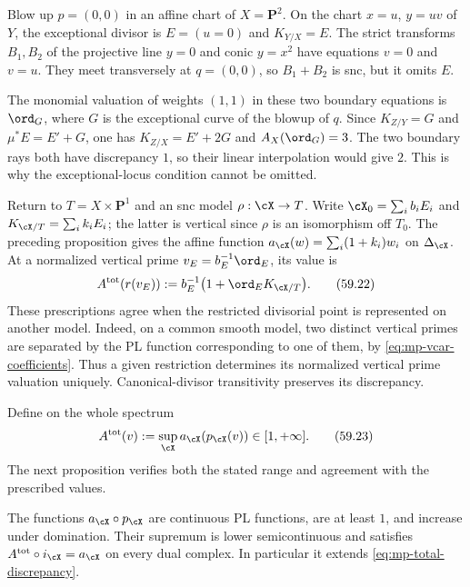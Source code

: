 \begin{example}\label{ex:mp-discrepancy-missing-boundary}
Blow up $p=(0,0)$ in an affine chart of $X=\mathbf P^2$.
On the chart $x=u$, $y=uv$ of $Y$, the exceptional divisor
is $E=(u=0)$ and $K_{Y/X}=E$. The strict transforms $B_1,B_2$
of the projective line $y=0$ and conic $y=x^2$ have equations
$v=0$ and $v=u$. They meet transversely at $q=(0,0)$, so
$B_1+B_2$ is snc, but it omits $E$.

The monomial valuation of weights $(1,1)$ in these two
boundary equations is $\ord_G$, where $G$ is the exceptional
curve of the blowup of $q$. Since $K_{Z/Y}=G$ and
$\mu^*E=E'+G$, one has $K_{Z/X}=E'+2G$ and
$A_X(\ord_G)=3$. The two boundary rays both have discrepancy
$1$, so their linear interpolation would give $2$.
This is why the exceptional-locus condition cannot be omitted.
\end{example}

Return to $T=X\times\mathbf P^1$ and an snc model
$\rho:\cX\to T$. Write
$\cX_0=\sum_i b_iE_i$ and $K_{\cX/T}=\sum_i k_iE_i$;
the latter is vertical since $\rho$ is an isomorphism off
$T_0$. The preceding proposition gives the affine function
$a_{\cX}(w)=\sum_i(1+k_i)w_i$ on $\Delta_{\cX}$.
At a normalized vertical prime $v_E=b_E^{-1}\ord_E$, its value is
\[
                 A^{\mathrm{tot}}(r(v_E))
                    :=b_E^{-1}\bigl(1+\ord_EK_{\cX/T}\bigr).
\tag{59.22}\label{eq:mp-total-discrepancy}
\]
These prescriptions agree when the restricted divisorial
point is represented on another model. Indeed, on a common
smooth model, two distinct vertical primes are separated
by the PL function corresponding to one of them, by
\eqref{eq:mp-vcar-coefficients}. Thus a given restriction
determines its normalized vertical prime valuation uniquely.
Canonical-divisor transitivity preserves its discrepancy.

Define on the whole spectrum
\[
 A^{\mathrm{tot}}(v)
       :=\sup_{\cX}a_{\cX}(p_{\cX}(v))\in[1,+\infty].
\tag{59.23}\label{eq:mp-discrepancy-envelope}
\]
The next proposition verifies both the stated range and
agreement with the prescribed values.

\begin{proposition}\label{prop:mp-discrepancy-model-envelope}
The functions $a_{\cX}\circ p_{\cX}$ are continuous PL
functions, are at least $1$, and increase under domination.
Their supremum is lower semicontinuous and satisfies
$A^{\mathrm{tot}}\circ i_{\cX}=a_{\cX}$ on every dual complex.
In particular it extends \eqref{eq:mp-total-discrepancy}.
\end{proposition}

